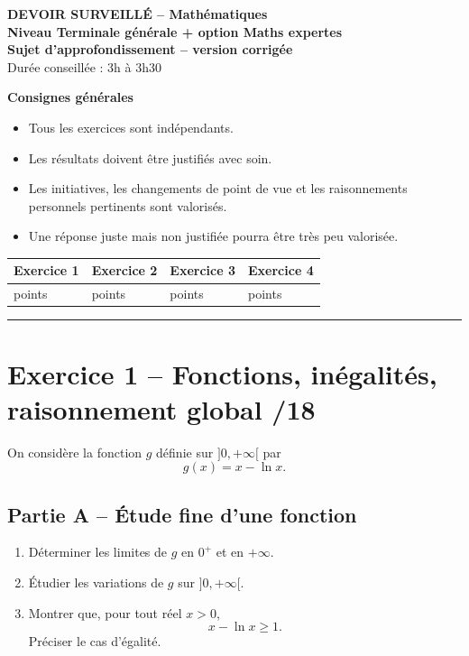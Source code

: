 \documentclass[11pt,a4paper]{article}
\begin{document}
\begin{center}
    {\Large \textbf{DEVOIR SURVEILLÉ -- Mathématiques}}\\[0.3em]
    {\large \textbf{Niveau Terminale générale + option Maths expertes}}\\[0.4em]
    {\large \textbf{Sujet d'approfondissement -- version corrigée}}\\[0.5em]
    Durée conseillée : 3h à 3h30
\end{center}

\vspace{0.4em}

\noindent\textbf{Consignes générales}
\begin{itemize}[leftmargin=1.8em]
    \item Tous les exercices sont indépendants.
    \item Les résultats doivent être justifiés avec soin.
    \item Les initiatives, les changements de point de vue et les raisonnements personnels pertinents sont valorisés.
    \item Une réponse juste mais non justifiée pourra être très peu valorisée.
\end{itemize}

\vspace{0.4em}

\begin{center}
\begin{tabular}{|>{\centering\arraybackslash}m{2.6cm}|>{\centering\arraybackslash}m{2.6cm}|>{\centering\arraybackslash}m{2.6cm}|>{\centering\arraybackslash}m{2.6cm}|}
\hline
Exercice 1 & Exercice 2 & Exercice 3 & Exercice 4 \\
\hline
18 points & 18 points & 22 points & 22 points \\
\hline
\end{tabular}
\end{center}

\vspace{0.5em}
\hrule
\vspace{0.6em}

\section*{Exercice 1 -- Fonctions, inégalités, raisonnement global \hfill /18}

On considère la fonction \(g\) définie sur \(]0,+\infty[\) par
\[
g(x)=x-\ln x.
\]

\subsection*{Partie A -- Étude fine d'une fonction}
\begin{enumerate}[label=\textbf{1.\arabic*}, leftmargin=1.6em]
    \item Déterminer les limites de \(g\) en \(0^+\) et en \(+\infty\).
    \item Étudier les variations de \(g\) sur \(]0,+\infty[\).
    \item Montrer que, pour tout réel \(x>0\),
    \[
    x-\ln x\ge 1.
    \]
    Préciser le cas d'égalité.
\end{enumerate}
\end{document}
